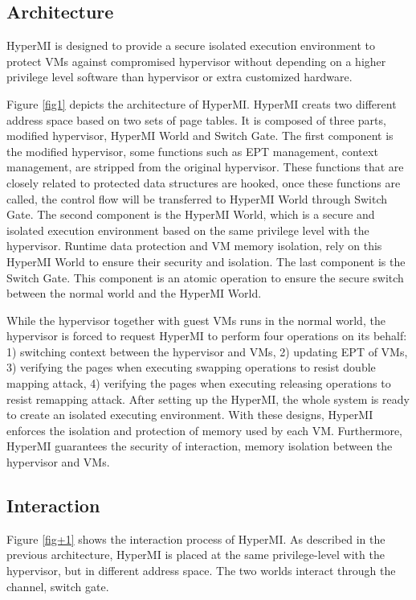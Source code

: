 \documentclass[conference]{IEEEtran}
\begin{document}
\subsection{Architecture} 
HyperMI is designed to provide a secure isolated execution environment to protect VMs against compromised hypervisor without depending on a higher privilege level software than hypervisor or extra customized hardware.



Figure \ref{fig1} depicts the architecture of HyperMI. HyperMI creats two different address space based on two sets of page tables. It is composed of three parts, modified hypervisor, HyperMI World and Switch Gate. The first component is the modified hypervisor, some functions such as EPT management, context management, are stripped from the original hypervisor. These functions that are closely related to protected data structures are hooked, once these functions are called, the control flow will be transferred to HyperMI World through Switch Gate. The second component is the HyperMI World, which is a secure and isolated execution environment based on the same privilege level with the hypervisor. Runtime data protection and VM memory isolation, rely on this HyperMI World to ensure their security and isolation. The last component is the Switch Gate. This component is an atomic operation to ensure the secure switch between the normal world and the HyperMI World. 


While the hypervisor together with guest VMs runs in the normal world, the hypervisor is forced to request HyperMI to perform four operations on its behalf: 1) switching context between the hypervisor and VMs, 2) updating EPT of VMs, 3) verifying the pages when executing swapping operations to resist double mapping attack, 4) verifying the pages when executing releasing operations to resist remapping attack. After setting up the HyperMI, the whole system is ready to create an isolated executing environment. With these designs, HyperMI enforces the isolation and protection of memory used by each VM. Furthermore, HyperMI guarantees the security of interaction, memory isolation between the hypervisor and VMs.



\iffalse
\subsection{Interaction} \label{IN}


Figure \ref{fig+1} shows the interaction process of HyperMI. 
As described in the previous architecture, HyperMI is placed at the same privilege-level with the hypervisor, but in different address space. The two worlds interact through the channel, switch gate.
\end{document}
